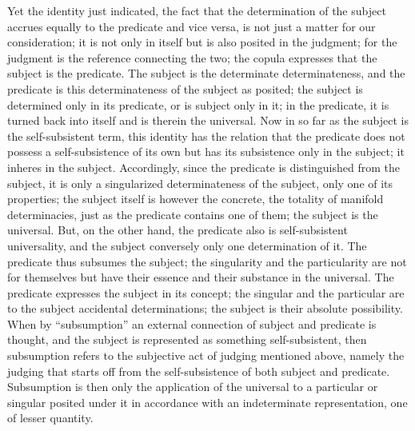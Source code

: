 Yet the identity just indicated, the fact that
the determination of the subject accrues equally
to the predicate and vice versa,
is not just a matter for our consideration;
it is not only in itself but is also posited in the judgment;
for the judgment is the reference connecting the two;
the copula expresses that the subject is the predicate.
The subject is the determinate determinateness,
and the predicate is this determinateness
of the subject as posited;
the subject is determined only in its predicate,
or is subject only in it;
in the predicate, it is turned back into itself
and is therein the universal.
Now in so far as the subject is the self-subsistent term,
this identity has the relation that the predicate
does not possess a self-subsistence of its own
but has its subsistence only in the subject;
it inheres in the subject.
Accordingly, since the predicate is distinguished from the subject,
it is only a singularized determinateness of the subject,
only one of its properties;
the subject itself is however the concrete,
the totality of manifold determinacies,
just as the predicate contains one of them;
the subject is the universal.
But, on the other hand, the predicate also is self-subsistent universality,
and the subject conversely only one determination of it.
The predicate thus subsumes the subject;
the singularity and the particularity are not for themselves
but have their essence and their substance in the universal.
The predicate expresses the subject in its concept;
the singular and the particular are to the
subject accidental determinations;
the subject is their absolute possibility.
When by “subsumption” an external connection
of subject and predicate is thought,
and the subject is represented as something self-subsistent,
then subsumption refers to the subjective
act of judging mentioned above,
namely the judging that starts off
from the self-subsistence of both subject and predicate.
Subsumption is then only the application of
the universal to a particular or singular
posited under it in accordance
with an indeterminate representation,
one of lesser quantity.

